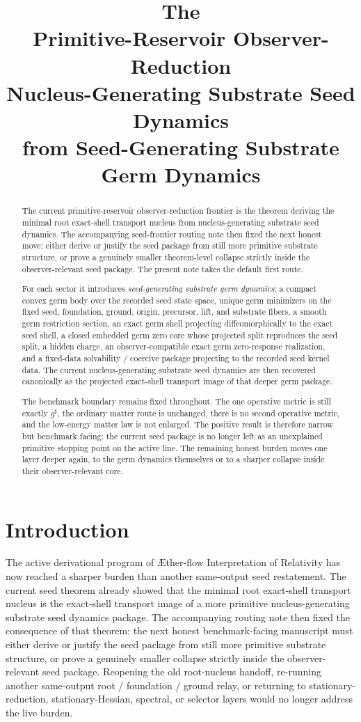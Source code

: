 \documentclass[11pt]{article}
\title{\textbf{The \TheoryName{}}\\[0.4em]
\large Primitive-Reservoir Observer-Reduction\\
\large Nucleus-Generating Substrate Seed Dynamics\\
\large from Seed-Generating Substrate Germ Dynamics}
\author{}
\date{}
\newcommand{\Aflow}{\AE{}ther-flow}
\newcommand{\TheoryName}{\Aflow{} Interpretation of Relativity}
\newcommand{\CompletedMetric}{g^{\sharp}}
\begin{document}
\maketitle

\begin{abstract}
The current primitive-reservoir observer-reduction frontier is the theorem deriving the minimal root exact-shell transport nucleus from nucleus-generating substrate seed dynamics. The accompanying seed-frontier routing note then fixed the next honest move: either derive or justify the seed package from still more primitive substrate structure, or prove a genuinely smaller theorem-level collapse strictly inside the observer-relevant seed package. The present note takes the default first route.

For each sector it introduces \emph{seed-generating substrate germ dynamics}: a compact convex germ body over the recorded seed state space, unique germ minimizers on the fixed seed, foundation, ground, origin, precursor, lift, and substrate fibers, a smooth germ restriction section, an exact germ shell projecting diffeomorphically to the exact seed shell, a closed embedded germ zero core whose projected split reproduces the seed split, a hidden charge, an observer-compatible exact germ zero-response realization, and a fixed-data solvability / coercive package projecting to the recorded seed kernel data. The current nucleus-generating substrate seed dynamics are then recovered canonically as the projected exact-shell transport image of that deeper germ package.

The benchmark boundary remains fixed throughout. The one operative metric is still exactly \(\CompletedMetric\), the ordinary matter route is unchanged, there is no second operative metric, and the low-energy matter law is not enlarged. The positive result is therefore narrow but benchmark facing: the current seed package is no longer left as an unexplained primitive stopping point on the active line. The remaining honest burden moves one layer deeper again, to the germ dynamics themselves or to a sharper collapse inside their observer-relevant core.
\end{abstract}

\section{Introduction}

The active derivational program of \TheoryName{} has now reached a sharper burden than another same-output seed restatement. The current seed theorem already showed that the minimal root exact-shell transport nucleus is the exact-shell transport image of a more primitive nucleus-generating substrate seed dynamics package. The accompanying routing note then fixed the consequence of that theorem: the next honest benchmark-facing manuscript must either derive or justify the seed package from still more primitive substrate structure, or prove a genuinely smaller collapse strictly inside the observer-relevant seed package. Reopening the old root-nucleus handoff, re-running another same-output root / foundation / ground relay, or returning to stationary-reduction, stationary-Hessian, spectral, or selector layers would no longer address the live burden.
\end{document}
